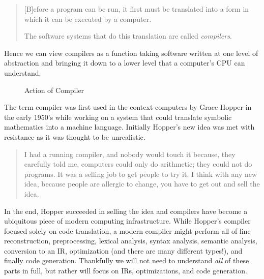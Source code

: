 \begin{quotation}
    [B]efore a program can be run, it first must be translated into a form in which it can be executed by a computer.

    The software systems that do this translation are called \emph{compilers}.
\end{quotation}
Hence we can view compilers as a function taking software written at one level of abstraction and bringing it down to a lower level that a computer's \ac{CPU} can understand.
\begin{figure}[ht]
    \centering
    
    \caption{Action of Compiler}\label{fig:compiler}
\end{figure}

The term compiler was first used in the context computers by Grace Hopper in the early 1950's while working on a system that could translate symbolic mathematics into a machine language.
Initially Hopper's new idea was met with resistance as it was thought to be unrealistic.
\begin{quotation}
    I had a running compiler, and nobody would touch it because, they carefully told me, computers could only do arithmetic; they could not do programs.
    It was a selling job to get people to try it.
    I think with any new idea, because people are allergic to change, you have to get out and sell the idea.
\end{quotation}
In the end, Hopper succeeded in selling the idea and compilers have become a ubiquitous piece of modern computing infrastructure.
While Hopper's compiler focused solely on code translation, a modern compiler might perform all of line reconstruction, preprocessing, lexical analysis, syntax analysis, semantic analysis, conversion to an \acf{IR}, optimization (and there are many different types!), and finally code generation.
Thankfully we will not need to understand \emph{all} of these parts in full, but rather will focus on \aclp{IR}, optimizations, and code generation.

